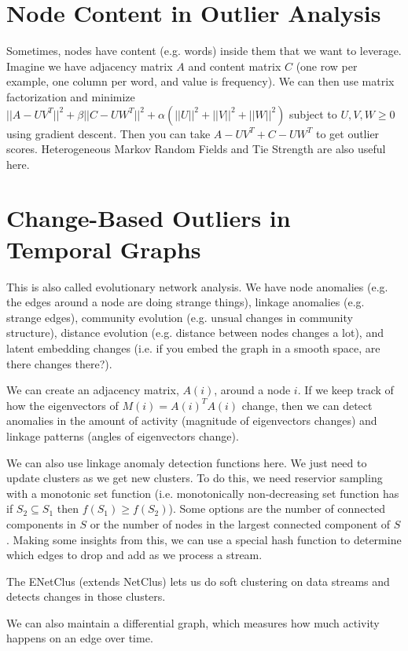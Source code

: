 \documentclass[a4paper]{article}
\begin{document}
\section{Node Content in Outlier Analysis}
Sometimes, nodes have content (e.g. words) inside them that we want to leverage.
Imagine we have adjacency matrix $A$ and content matrix $C$ (one row per example,
one column per word, and value is frequency). We can then use matrix
factorization and minimize $||A - UV^T||^2 + \beta ||C - UW^T||^2 + \alpha (
||U||^2 + ||V||^2 + ||W||^2)$ subject to $U, V, W \geq 0$ using gradient
descent. Then you can take $A - UV^T + C - UW^T$ to get outlier scores. Heterogeneous
Markov Random Fields and Tie Strength are also useful here.

\section{Change-Based Outliers in Temporal Graphs}
This is also called evolutionary network analysis. We have node anomalies
(e.g. the edges around a node are doing strange things), linkage anomalies (e.g.
strange edges), community evolution (e.g. unsual changes in community
structure), distance evolution (e.g. distance between nodes changes a lot),
and latent embedding changes (i.e. if you embed the graph in a smooth space,
are there changes there?).

We can create an adjacency matrix, $A(i)$, around a node $i$. If we keep track
of how the eigenvectors of $M(i) = A(i)^T A(i)$ change, then we can detect
anomalies in the amount of activity (magnitude of eigenvectors changes) and
linkage patterns (angles of eigenvectors change).

We can also use linkage anomaly detection functions here. We just need to update
clusters as we get new clusters. To do this, we need reservior sampling with a
monotonic set function (i.e. monotonically non-decreasing set function has
if $S_2 \subseteq S_1$ then $f(S_1) \geq f(S_2)$). Some options are the number
of connected components in $S$ or the number of nodes in the largest connected
component of $S$. Making some insights from this, we can use a special hash
function to determine which edges to drop and add as we process a stream.

The ENetClus (extends NetClus) lets us do soft clustering on data streams and
detects changes in those clusters.

We can also maintain a differential graph, which measures how much activity
happens on an edge over time.
\end{document}
